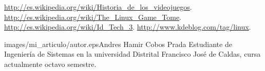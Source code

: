 \begin{multicols}{2}

\begin{bibliografia}
\url{http://es.wikipedia.org/wiki/Historia_de_los_videojuegos}.
\url{http://es.wikipedia.org/wiki/The_Linux_Game_Tome}.
\url{http://es.wikipedia.org/wiki/Id_Tech_3}.
\url{http://www.kdeblog.com/tag/linux}.
\end{bibliografia}


\begin{biografia}{images/mi_articulo/autor.eps}{Andres Hamir Cobos Prada} %
Estudiante de Ingeniería de Sistemas en la universidad Distrital Francisco José de Caldas, cursa actualmente octavo semestre.  
\end{biografia}

\end{multicols} %


\clearpage
\pagebreak
